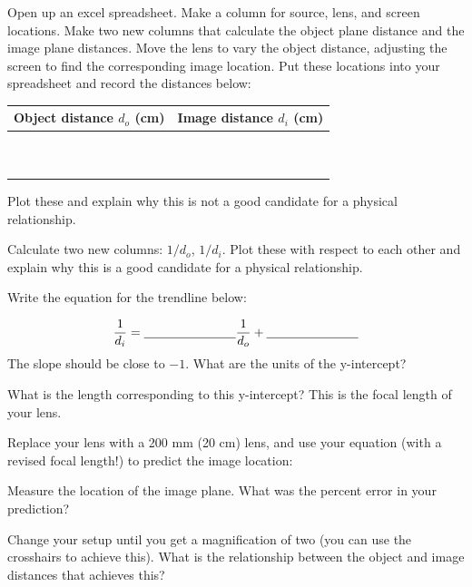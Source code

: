 \documentclass{handout}
\begin{document}
\begin{questions}
    \question Open up an excel spreadsheet. Make a column for source, lens, and screen locations. Make two new columns that calculate the object plane distance and the image plane distances. Move the lens to vary the object distance, adjusting the screen to find the corresponding image location. Put these locations into your spreadsheet and record the distances below:
     \begin{table}[h!]
        \begin{tabular}{c|c}
             Object distance $d_o$ (cm) & Image distance $d_i$ (cm) \\\hline
             & \\
             & \\
             & \\
             & \\
             & \\
             & \\
             & \\
             & \\
             & \\
             & \\
        \end{tabular}
    \end{table}

\clearpage
    \question Plot these and explain why this is not a good candidate for a physical relationship.

    \answerspace{2in}

    \question Calculate two new columns: $1/d_o$, $1/d_i$. Plot these with respect to each other and explain why this is a good candidate for a physical relationship.

    \answerspace{1.5in}

    \question Write the equation for the trendline below:

    \answerspace{\baselineskip}
$$
\frac{1}{d_i}= \text{\blank[1in]} \frac{1}{d_o} + \text{\blank[1in]}
$$
    \question The slope should be close to $-1$. What are the units of the y-intercept?

    \answerspace{1.5in}

    \question What is the length corresponding to this y-intercept? This is the focal length of your lens.

    \answerspace{1.5in}
\clearpage
    \question Replace your lens with a 200 mm (20 cm) lens, and use your equation (with a revised focal length!) to predict the image location:

    \answerspace{1.5in}

    \question Measure the location of the image plane. What was the percent error in your prediction?

    \answerspace{1.5in}

    \question Change your setup until you get a magnification of two (you can use the crosshairs to achieve this). What is the relationship between the object and image distances that achieves this?

    \answerspace{1.5in}

\end{questions}
\end{document}
